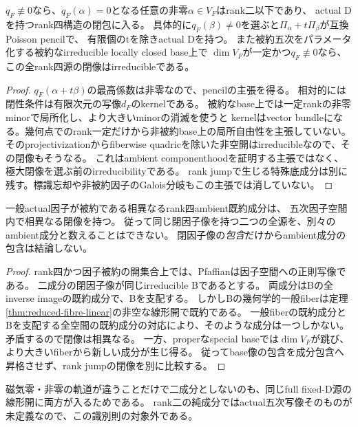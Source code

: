 \begin{corollary}[rank二境界と相対閉像]\label{cor:reduced-fibre-boundary}
$q_F\not\equiv0$なら、$q_F(\alpha)=0$となる任意の非零$\alpha\in V_F$はrank二以下であり、
actual Dを持つrank四構造の閉包に入る。
具体的に$q_F(\beta)\ne0$を選ぶと$\Pi_\alpha+t\Pi_\beta$が互換Poisson pencilで、
有限個のtを除きactual Dを持つ。
また被約五次をパラメータ化する被約なirreducible locally closed base上で
$\dim V_F$が一定かつ$q_F\not\equiv0$なら、
この全rank四源の閉像はirreducibleである。
\end{corollary}
\begin{proof}
$q_F(\alpha+t\beta)$の最高係数は非零なので、pencilの主張を得る。
相対的には閉性条件は有限次元の写像$d_F$のkernelである。
被約なbase上では一定rankの非零minorで局所化し、より大きいminorの消滅を使うと
kernelはvector bundleになる。幾何点でのrank一定だけから非被約base上の局所自由性を主張していない。
そのprojectivizationからfiberwise quadricを除いた非空開はirreducibleなので、その閉像もそうなる。
これはambient componenthoodを証明する主張ではなく、極大閉像を選ぶ前のirreducibilityである。
rank jumpで生じる特殊底成分は別に残す。標識忘却や非被約因子のGalois分岐もこの主張では消していない。
\end{proof}

\begin{corollary}[被約因子像は全成分の重複を識別する]\label{cor:reduced-divisor-component-images}
一般actual因子が被約である相異なるrank四ambient既約成分は、
五次因子空間内で相異なる閉像を持つ。
従って同じ閉因子像を持つ二つの全源を、別々のambient成分と数えることはできない。
閉因子像の\emph{包含}だけからambient成分の包含は結論しない。
\end{corollary}
\begin{proof}
rank四かつ因子被約の開集合上では、Pfaffianは因子空間への正則写像である。
二成分の閉因子像が同じirreducible Bであるとする。
両成分はBの全inverse imageの既約成分で、Bを支配する。
しかしBの幾何学的一般fiberは定理\ref{thm:reduced-fibre-linear}の非空な線形開で既約である。
一般fiberの既約成分とBを支配する全空間の既約成分の対応により、そのような成分は一つしかない。
矛盾するので閉像は相異なる。
一方、properなspecial baseでは$\dim V_F$が跳び、より大きいfiberから新しい成分が生じ得る。
従ってbase像の包含を成分包含へ昇格させず、rank jumpの閉像を別に比較する。
\end{proof}
磁気零・非零の軌道が違うことだけで二成分としないのも、同じfull fixed-D源の線形開に両方が入るためである。
rank二の純成分ではactual五次写像そのものが未定義なので、この識別則の対象外である。

